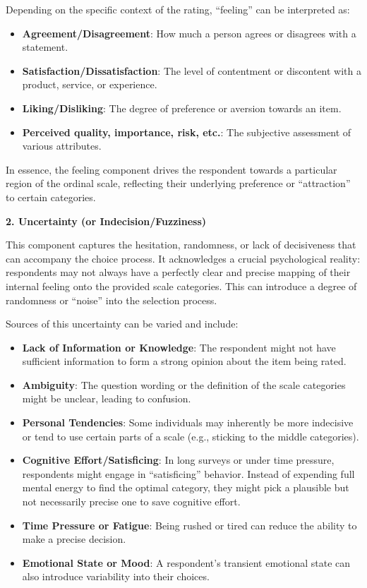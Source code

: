 \documentclass[
  letterpaper,
  DIV=11,
  numbers=noendperiod]{scrartcl}
\begin{document}
Depending on the specific context of the rating, ``feeling'' can be
interpreted as:

\begin{itemize}
\item
  \textbf{Agreement/Disagreement}: How much a person agrees or disagrees
  with a statement.
\item
  \textbf{Satisfaction/Dissatisfaction}: The level of contentment or
  discontent with a product, service, or experience.
\item
  \textbf{Liking/Disliking}: The degree of preference or aversion
  towards an item.
\item
  \textbf{Perceived quality, importance, risk, etc.}: The subjective
  assessment of various attributes.
\end{itemize}

In essence, the feeling component drives the respondent towards a
particular region of the ordinal scale, reflecting their underlying
preference or ``attraction'' to certain categories.

\textbf{2. Uncertainty (or Indecision/Fuzziness)}

This component captures the hesitation, randomness, or lack of
decisiveness that can accompany the choice process. It acknowledges a
crucial psychological reality: respondents may not always have a
perfectly clear and precise mapping of their internal feeling onto the
provided scale categories. This can introduce a degree of randomness or
``noise'' into the selection process.

Sources of this uncertainty can be varied and include:

\begin{itemize}
\item
  \textbf{Lack of Information or Knowledge}: The respondent might not
  have sufficient information to form a strong opinion about the item
  being rated.
\item
  \textbf{Ambiguity}: The question wording or the definition of the
  scale categories might be unclear, leading to confusion.
\item
  \textbf{Personal Tendencies}: Some individuals may inherently be more
  indecisive or tend to use certain parts of a scale (e.g., sticking to
  the middle categories).
\item
  \textbf{Cognitive Effort/Satisficing}: In long surveys or under time
  pressure, respondents might engage in ``satisficing'' behavior.
  Instead of expending full mental energy to find the optimal category,
  they might pick a plausible but not necessarily precise one to save
  cognitive effort.
\item
  \textbf{Time Pressure or Fatigue}: Being rushed or tired can reduce
  the ability to make a precise decision.
\item
  \textbf{Emotional State or Mood}: A respondent's transient emotional
  state can also introduce variability into their choices.
\end{itemize}
\end{document}
